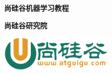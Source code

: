 \documentclass[twoside,nofonts,fancyhdr,openany,UTF8,fontset = fandol]{ctexbook}
\begin{document}
\begin{titlepage}
  \begin{center}
      \vspace*{1cm}

      \textbf{尚硅谷机器学习教程}

      \vspace{1.5cm}

      \textbf{尚硅谷研究院}

      \vfill

      \vspace{0.8cm}

      \includegraphics[width=0.4\textwidth]{atguigu.jpeg}

  \end{center}
\end{titlepage}

\tableofcontents


    
\end{document}
